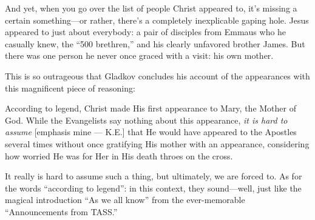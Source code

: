 And yet, when you go over the list of people Christ appeared to, it's missing a certain something---or rather, there's a completely inexplicable gaping hole. Jesus appeared to just about everybody: a pair of disciples from Emmaus who he casually knew, the ``500 brethren,'' and his clearly unfavored brother James. But there was one person he never once graced with a visit: his own mother.

This is so outrageous that Gladkov concludes his account of the appearances with this magnificent piece of reasoning:

\begin{smallquote}
    According to legend, Christ made His first appearance to Mary, the Mother of God. While the Evangelists say nothing about this appearance, \emph{it is hard to assume} [emphasis mine --- K.E.] that He would have appeared to the Apostles several times without once gratifying His mother with an appearance, considering how worried He was for Her in His death throes on the cross.
\end{smallquote}
It really is hard to assume such a thing, but ultimately, we are forced to. As for the words ``according to legend'': in this context, they sound---well, just like the magical introduction ``As we all know'' from the ever-memorable ``Announcements from TASS.''
